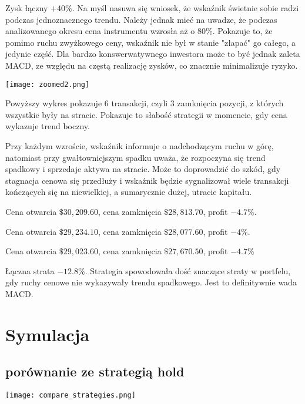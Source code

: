 \documentclass[11pt]{article}
\newcounter{boxlblcounter}
\newcommand{\makeboxlabel}[1]{\fbox{#1.}\hfill}%
\newenvironment{boxlabel}
  {\begin{list}
    {\arabic{boxlblcounter}}
    {\usecounter{boxlblcounter}
     \setlength{\labelwidth}{3em}
     \setlength{\labelsep}{0em}
     \setlength{\itemsep}{2pt}
     \setlength{\leftmargin}{1.5cm}
     \setlength{\rightmargin}{2cm}
     \setlength{\itemindent}{0em} 
     \let\makelabel=\makeboxlabel
    }
  }
{\end{list}}
\begin{document}
    Zysk łączny $+40\%$.
    Na myśl nasuwa się wniosek, że wskaźnik świetnie sobie radzi podczas jednoznacznego trendu.
    Należy jednak mieć na uwadze, że podczas analizowanego okresu cena instrumentu wzrosła aż o $80\%$. 
    Pokazuje to, że pomimo ruchu zwyżkowego ceny, wskaźnik nie był w stanie "złapać" go całego, a jedynie część.
    Dla bardzo konswerwatywnego inwestora może to być jednak zaleta MACD, ze względu na częstą realizację zysków, co znacznie minimalizuje ryzyko.
    \begin{center}
        \texttt{[image: zoomed2.png]}
    \end{center}
    
    Powyższy wykres pokazuje 6 transakcji, czyli 3 zamknięcia pozycji, z których wszystkie były na stracie.
    Pokazuje to słabość strategii w momencie, gdy cena wykazuje trend boczny.
    
    Przy każdym wzroście, wskaźnik informuje o nadchodzącym ruchu w górę, natomiast przy gwałtowniejszym spadku uważa, że rozpoczyna się trend spadkowy i sprzedaje aktywa na stracie.
    Może to doprowadzić do szkód, gdy stagnacja cenowa się przedłuży i wskaźnik będzie sygnalizował wiele transakcji kończących się na niewielkiej, a sumarycznie dużej, utracie kapitału.

    \begin{boxlabel}
        \item Cena otwarcia $\$30,209.60$, cena zamknięcia $\$28,813.70$, profit $-4.7\%$.
        \item Cena otwarcia $\$29,234.10$, cena zamknięcia $\$28,077.60$, profit $-4\%$.
        \item Cena otwarcia $\$29,023.60$, cena zamknięcia $\$27,670.50$, profit $-4.7\%$
    \end{boxlabel}
    
    Łączna strata $-12.8\%$. Strategia spowodowała dość znaczące straty w portfelu, gdy ruchy cenowe nie wykazywały trendu spadkowego.
    Jest to definitywnie wada MACD.

    \section{Symulacja}
    \subsection{porównanie ze strategią hold}
    
    \begin{center}
        \texttt{[image: compare\_strategies.png]}
    \end{center}
\end{document}
